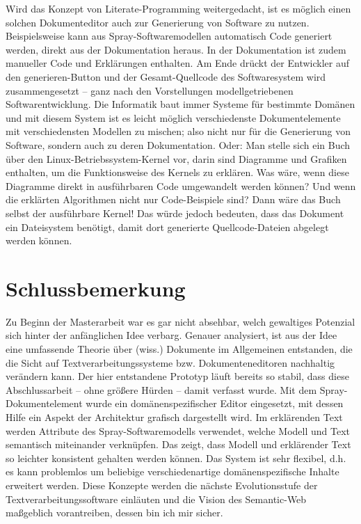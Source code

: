  
Wird das Konzept von Literate-Programming weitergedacht, ist es möglich einen solchen Dokumenteditor auch zur Generierung von Software zu nutzen. Beispielsweise kann aus Spray-Softwaremodellen automatisch Code generiert werden, direkt aus der Dokumentation heraus. In der Dokumentation ist zudem manueller Code und Erklärungen enthalten. Am Ende drückt der Entwickler auf den generieren-Button und der Gesamt-Quellcode des Softwaresystem wird zusammengesetzt -- ganz nach den Vorstellungen modellgetriebenen Softwarentwicklung. Die Informatik baut immer Systeme für bestimmte Domänen und mit diesem System ist es leicht möglich verschiedenste Dokumentelemente mit verschiedensten Modellen zu mischen; also nicht nur für die Generierung von Software, sondern auch zu deren Dokumentation. Oder: Man stelle sich ein Buch über den Linux-Betriebssystem-Kernel vor, darin sind Diagramme und Grafiken enthalten, um die Funktionsweise des Kernels zu erklären. Was wäre, wenn diese Diagramme direkt in ausführbaren Code umgewandelt werden können? Und wenn die erklärten Algorithmen nicht nur Code-Beispiele sind? Dann wäre das Buch selbst der ausführbare Kernel! Das würde jedoch bedeuten, dass das Dokument ein Dateisystem benötigt, damit dort generierte Quellcode-Dateien abgelegt werden können.

 
\section{Schlussbemerkung}\label{}
 
Zu Beginn der Masterarbeit war es gar nicht absehbar, welch gewaltiges Potenzial sich hinter der anfänglichen Idee verbarg. Genauer analysiert, ist aus der Idee eine umfassende Theorie über (wiss.) Dokumente im Allgemeinen entstanden, die die Sicht auf Textverarbeitungssysteme bzw. Dokumenteneditoren nachhaltig verändern kann. Der hier entstandene Prototyp läuft bereits so stabil, dass diese Abschlussarbeit -- ohne größere Hürden -- damit verfasst wurde. Mit dem Spray-Dokumentelement wurde ein domänenspezifischer Editor eingesetzt, mit dessen Hilfe ein Aspekt der Architektur grafisch dargestellt wird. Im erklärenden Text werden Attribute des Spray-Softwaremodells verwendet, welche Modell und Text semantisch miteinander verknüpfen. Das zeigt, dass Modell und erklärender Text so leichter konsistent gehalten werden können. Das System ist sehr flexibel, d.h. es kann problemlos um beliebige verschiedenartige domänenspezifische Inhalte erweitert werden. Diese Konzepte werden die nächste Evolutionsstufe der Textverarbeitungssoftware einläuten und die Vision des Semantic-Web maßgeblich vorantreiben, dessen bin ich mir sicher.

